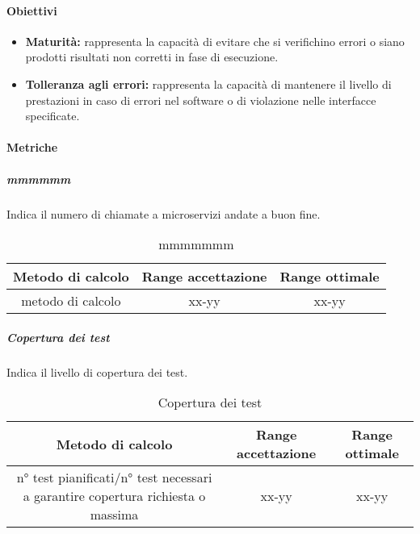 		\paragraph{Obiettivi}
			\begin{itemize}
				\item \textbf{Maturità:} rappresenta la capacità di evitare che si verifichino errori o siano prodotti risultati non corretti in fase di esecuzione.
				\item \textbf{Tolleranza agli errori:} rappresenta la capacità di mantenere il livello di prestazioni in caso di errori nel software o di violazione nelle interfacce specificate.
			\end{itemize}
		
		\paragraph{Metriche}
			\subparagraph{mmmmmm}
			Indica il numero di chiamate a microservizi andate a buon fine.
			\begin{table}[H]
				\begin{center}
					\begin{tabular}{|c|c|c|}
						\hline
						\textbf{Metodo di calcolo} & \textbf{Range accettazione} & \textbf{Range ottimale} \\
						\hline
						metodo di calcolo & xx-yy  & xx-yy \\
						\hline
					\end{tabular}
				\end{center}
				\caption{mmmmmmm}
			\end{table}
		
			\subparagraph{Copertura dei test}
			Indica il livello di copertura dei test.
			\begin{table}[H]
				\begin{center}
					\begin{tabular}{|c|c|c|}
						\hline
						\textbf{Metodo di calcolo} & \textbf{Range accettazione} & \textbf{Range ottimale} \\
						\hline
						n° test pianificati/n° test necessari a garantire copertura richiesta o massima & xx-yy  & xx-yy \\
						\hline
					\end{tabular}
				\end{center}
				\caption{Copertura dei test}
			\end{table}
			
